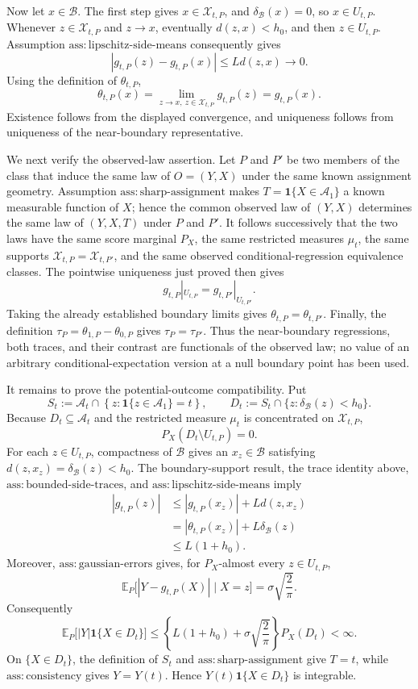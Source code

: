 Now let \(x\in\mathcal B\). The first step gives \(x\in\mathcal X_{t,P}\), and \(\delta_{\mathcal B}(x)=0\), so \(x\in U_{t,P}\). Whenever \(z\in\mathcal X_{t,P}\) and \(z\to x\), eventually \(d(z,x)<h_0\), and then \(z\in U_{t,P}\). Assumption \(\mathrm{ass:lipschitz\text{-}side\text{-}means}\) consequently gives
\[
|g_{t,P}(z)-g_{t,P}(x)|\le Ld(z,x)\longrightarrow0.
\]
Using the definition of \(\theta_{t,P}\),
\[
\theta_{t,P}(x)
=\lim_{z\to x,\ z\in\mathcal X_{t,P}}g_{t,P}(z)
=g_{t,P}(x).
\]
Existence follows from the displayed convergence, and uniqueness follows from uniqueness of the near-boundary representative.

We next verify the observed-law assertion. Let \(P\) and \(P'\) be two members of the class that induce the same law of \(O=(Y,X)\) under the same known assignment geometry. Assumption \(\mathrm{ass:sharp\text{-}assignment}\) makes \(T=\mathbf 1\{X\in\mathcal A_1\}\) a known measurable function of \(X\); hence the common observed law of \((Y,X)\) determines the same law of \((Y,X,T)\) under \(P\) and \(P'\). It follows successively that the two laws have the same score marginal \(P_X\), the same restricted measures \(\mu_t\), the same supports \(\mathcal X_{t,P}=\mathcal X_{t,P'}\), and the same observed conditional-regression equivalence classes. The pointwise uniqueness just proved then gives
\[
g_{t,P}|_{U_{t,P}}=g_{t,P'}|_{U_{t,P'}}.
\]
Taking the already established boundary limits gives \(\theta_{t,P}=\theta_{t,P'}\). Finally, the definition \(\tau_P=\theta_{1,P}-\theta_{0,P}\) gives \(\tau_P=\tau_{P'}\). Thus the near-boundary regressions, both traces, and their contrast are functionals of the observed law; no value of an arbitrary conditional-expectation version at a null boundary point has been used.

It remains to prove the potential-outcome compatibility. Put
\[
S_t:=\mathcal A_t\cap\left\{z:\mathbf 1\{z\in\mathcal A_1\}=t\right\},
\qquad
D_t:=S_t\cap\{z:\delta_{\mathcal B}(z)<h_0\}.
\]
Because \(D_t\subseteq\mathcal A_t\) and the restricted measure \(\mu_t\) is concentrated on \(\mathcal X_{t,P}\),
\[
P_X(D_t\setminus U_{t,P})=0.
\]
For each \(z\in U_{t,P}\), compactness of \(\mathcal B\) gives an \(x_z\in\mathcal B\) satisfying \(d(z,x_z)=\delta_{\mathcal B}(z)<h_0\). The boundary-support result, the trace identity above, \(\mathrm{ass:bounded\text{-}side\text{-}traces}\), and \(\mathrm{ass:lipschitz\text{-}side\text{-}means}\) imply
\[
\begin{aligned}
|g_{t,P}(z)|
&\le |g_{t,P}(x_z)|+Ld(z,x_z)\\
&=|\theta_{t,P}(x_z)|+L\delta_{\mathcal B}(z)\\
&\le L(1+h_0).
\end{aligned}
\]
Moreover, \(\mathrm{ass:gaussian\text{-}errors}\) gives, for \(P_X\)-almost every \(z\in U_{t,P}\),
\[
\mathbb E_P\bigl[|Y-g_{t,P}(X)|\mid X=z\bigr]
=\sigma\sqrt{\frac{2}{\pi}}.
\]
Consequently
\[
\mathbb E_P\bigl[|Y|\mathbf 1\{X\in D_t\}\bigr]
\le \left\{L(1+h_0)+\sigma\sqrt{\frac{2}{\pi}}\right\}P_X(D_t)<\infty.
\]
On \(\{X\in D_t\}\), the definition of \(S_t\) and \(\mathrm{ass:sharp\text{-}assignment}\) give \(T=t\), while \(\mathrm{ass:consistency}\) gives \(Y=Y(t)\). Hence \(Y(t)\mathbf 1\{X\in D_t\}\) is integrable.

